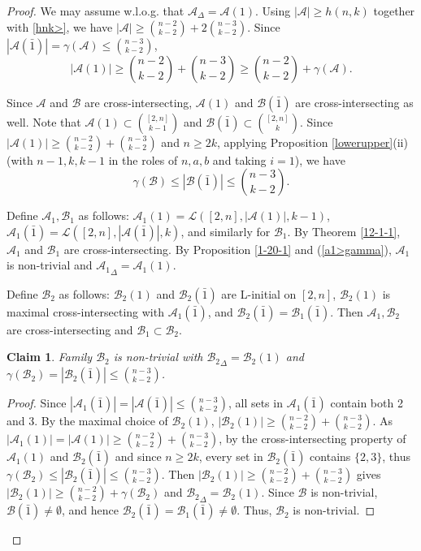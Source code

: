 \documentclass[a4paper,11pt]{article}
\newtheorem{claim}[theorem]{Claim}
\newcommand{\m}{\mathcal}
\begin{document}
\begin{proof}
We  may assume w.l.o.g. that $\m A_{\Delta}=\mathcal{A}(1)$. 
Using $|\m A|\ge h(n,k)$ together with \eqref{hnk>}, we have $|\m A|\ge {n-2\choose k-2}+2{n-3\choose k-2}$. Since $|\m A(\bar1)|=\gamma(\m A)\le {n-3\choose k-2}$,
\begin{equation}\label{a1>gamma}
    |\m A(1)|\ge{n-2\choose k-2}+{n-3\choose k-2} \ge{n-2\choose k-2}+\gamma(\m A).
\end{equation}

Since $\m A$ and $\m B $ are cross-intersecting, $\m A(1)$ and $\m B(\bar1)$ are cross-intersecting as well.
Note that $\m A(1)\subset {[2,n]\choose k-1}$ and $\m B(\bar1) \subset {[2,n]\choose k}$.
Since 
$|\m A(1)|\ge {n-2\choose k-2}+{n-3\choose k-2}$ and $n\ge 2k$, applying Proposition \ref{lowerupper}(ii) (with $n-1, k, k-1$ in the roles of $n, a,b$ and taking $i=1$),  
we have 
$$\gamma(\m B)\le |\m B(\bar1)|\le {n-3\choose k-2}.$$

Define $\m A_1, \m B_1$ as follows: $\mathcal{A}_1(1)=\mathcal{L}([2,n], |\mathcal{A}(1)|, k-1)$,  $\mathcal{A}_1(\bar{1})=\mathcal{L}([2,n], |\mathcal{A}(\bar{1})|, k)$, and similarly for $\m B_1$. 
By Theorem \ref{12-1-1}, $\mathcal{A}_1$ and $\mathcal{B}_1$ are cross-intersecting. 
By Proposition \ref{1-20-1} and (\ref{a1>gamma}), $\m A_1$ is non-trivial and ${\m A_1}_{\Delta}=\m A_1(1)$. 

Define $\m B_2$ as follows: $\m B_2(1)$ and $\m B_2(\bar1)$ are L-initial on $[2,n]$, 
$\m B_2(1)$ is maximal cross-intersecting with ${\m A_1}(\bar{1})$, and $\m B_2(\bar{1})=\m B_1(\bar{1})$. Then 
$\m A_1, \m B_2$ are cross-intersecting and $\m B_1\subset \m B_2$. 

\begin{claim}\label{b2nontrivial}
Family $\m B_2$ is non-trivial with ${\m B_2}_{\Delta}=\m B_2(1)$ and $\gamma(\m B_2)=|\m B_2(\bar1)|\le {n-3\choose k-2}$.
\end{claim}
\begin{proof}
Since $|\m A_1(\bar{1})|=|\m A(\bar{1})|\le {n-3\choose k-2}$, 
all sets in $\m A_1(\bar{1})$ contain both 2 and 3.
By the maximal choice of $\m B_2(1)$, $|\m B_2(1)|\ge {n-2\choose k-2}+{n-3\choose k-2}$.
As $|\m A_1(1)|=|\m A(1)|\ge {n-2\choose k-2}+{n-3\choose k-2}$, by the cross-intersecting property
of $\m A_1(1)$ and $\m B_2(\bar{1})$ and since $n\ge 2k$,
every set in $\m B_2(\bar{1})$ contains $\{2,3\}$, thus 
$\gamma(\m B_2)\le |\m B_2(\bar{1})|\le {n-3\choose k-2}$.
Then $|\m B_2(1)|\ge {n-2\choose k-2}+{n-3\choose k-2}$ gives
$|\m B_2(1)|\ge {n-2\choose k-2}+\gamma(\m B_2)$ and ${\m B_2}_{\Delta}=\m B_2(1)$. 
Since $\m B$ is non-trivial, $\m B(\bar 1)\ne \emptyset$, 
and hence $\m B_2(\bar 1)=\m B_1(\bar 1)\ne \emptyset$.
Thus, $\m B_2$ is non-trivial.
\end{proof}


\end{proof}
\end{document}
